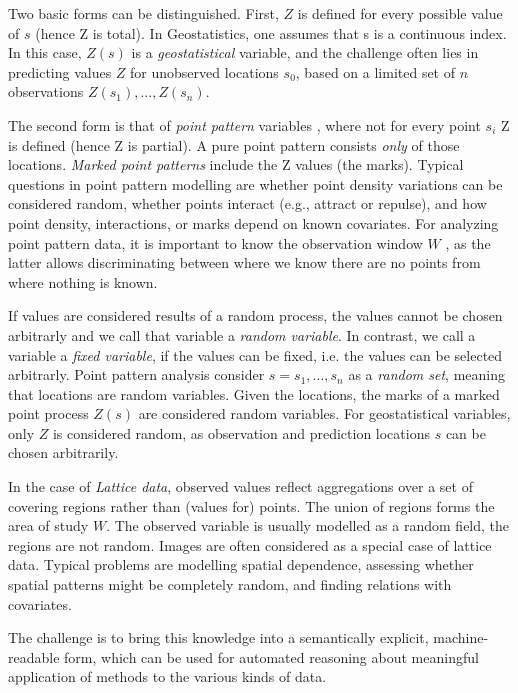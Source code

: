 \documentclass[final,authoryear,1p,times]{elsarticle}
\begin{document}
Two basic forms can be distinguished. First, $Z$ is defined for every possible value of $s$ (hence Z is total). In Geostatistics, one assumes that s is a continuous index. In this case, $Z(s)$ is a {\em geostatistical} variable, and the challenge often lies in predicting values $Z$ for unobserved locations $s_0$, based on a limited set of $n$ observations $Z(s_1),...,Z(s_n)$. 

The second form is that of {\em point pattern} variables \citep{Illian2008}, where not for every point $s_i$ Z is defined (hence Z is partial).  A pure point pattern consists {\em only} of those locations. {\em Marked point patterns} include the Z values (the marks).  Typical questions in point pattern modelling are whether point density variations can be considered random, whether points interact (e.g., attract or repulse), and how point density, interactions, or marks depend on known covariates. For analyzing point pattern data, it is important to know the observation window $W$ \citep{Baddeley2005}, as the latter allows discriminating between where we know there are no points from where nothing is known.

If values are considered results of a random process, the values cannot be chosen arbitrarly and we call that variable a \textit{random variable}. In contrast, we call a variable a \textit{fixed variable}, if the values can be fixed, i.e. the values can be selected arbitrarly. Point pattern analysis consider $s=s_1,...,s_n$ as a {\em random set}, meaning that locations are random variables.  Given the locations, the marks of a marked point process $Z(s)$ are considered random variables. For geostatistical variables, only $Z$ is considered random, as observation and prediction locations $s$ can be chosen arbitrarily.

In the case of {\em Lattice data}, observed values reflect aggregations over a set of covering regions rather than (values for) points. The union of regions forms the area of study $W$.  The observed variable is usually modelled as a random field, the regions are not random.  Images are often considered as a special case of lattice data.  Typical problems are modelling spatial dependence, assessing whether spatial patterns might be completely random, and finding relations with covariates.

The challenge is to bring this knowledge into a semantically explicit, machine-readable form, which can be used for automated reasoning about meaningful application of methods to the various kinds of data.
\end{document}
